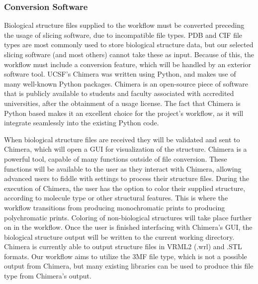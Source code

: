 \documentclass[letterpaper, onecolumn, draftclsnofoot, 10pt, compsoc]{IEEEtran}
\begin{document}
\begin{singlespace}
        \subsubsection{Conversion Software}
        Biological structure files supplied to the workflow must be converted preceding the usage of slicing software, due to incompatible file types.
        PDB and CIF file types are most commonly used to store biological structure data, but our selected slicing software (and most others) cannot take these as input.
        Because of this, the workflow must include a conversion feature, which will be handled by an exterior software tool.
        UCSF's Chimera was written using Python, and makes use of many well-known Python packages.
        Chimera is an open-source piece of software that is publicly available to students and faculty associated with accredited universities, after the obtainment of a usage license.
        The fact that Chimera is Python based makes it an excellent choice for the project's workflow, as it will integrate seamlessly into the existing Python code.\par
        
        When biological structure files are received they will be validated and sent to Chimera, which will open a GUI for visualization of the structure.
        Chimera is a powerful tool, capable of many functions outside of file conversion.
        These functions will be available to the user as they interact with Chimera, allowing advanced users to fiddle with settings to process their structure files.
        During the execution of Chimera, the user has the option to color their supplied structure, according to molecule type or other structural features.
        This is where the workflow transitions from producing monochromatic prints to producing polychromatic prints.
        Coloring of non-biological structures will take place further on in the workflow. 
        Once the user is finished interfacing with Chimera's GUI, the biological structure output will be written to the current working directory. 
        Chimera is currently able to output structure files in VRML2 (.wrl) and .STL formats.
        Our workflow aims to utilize the 3MF file type, which is not a possible output from Chimera, but many existing libraries can be used to produce this file type from Chimera's output.
        

\end{singlespace}
\end{document}
